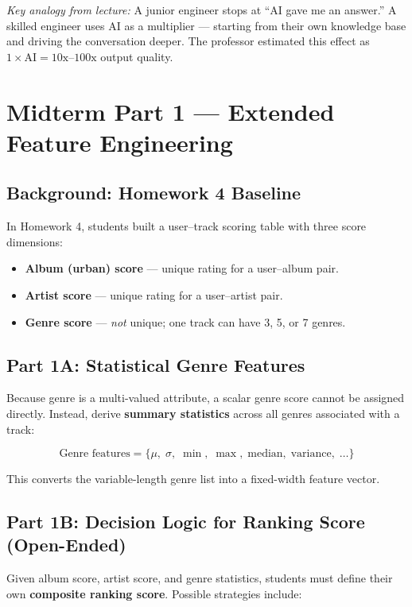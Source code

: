 \documentclass[11pt]{article}
\begin{document}
\textit{Key analogy from lecture:} A junior engineer stops at ``AI gave me an answer.''
A skilled engineer uses AI as a multiplier --- starting from their own knowledge base and driving the conversation deeper.
The professor estimated this effect as $1 \times \text{AI} = 10\text{x}$--$100\text{x}$ output quality.


\section{Midterm Part 1 --- Extended Feature Engineering}

\subsection{Background: Homework 4 Baseline}
In Homework 4, students built a user--track scoring table with three score dimensions:
\begin{itemize}
    \item \textbf{Album (urban) score} --- unique rating for a user--album pair.
    \item \textbf{Artist score} --- unique rating for a user--artist pair.
    \item \textbf{Genre score} --- \emph{not} unique; one track can have 3, 5, or 7 genres.
\end{itemize}

\subsection{Part 1A: Statistical Genre Features}
Because genre is a multi-valued attribute, a scalar genre score cannot be assigned directly.
Instead, derive \textbf{summary statistics} across all genres associated with a track:

\[
\text{Genre features} = \{\mu,\; \sigma,\; \min,\; \max,\; \text{median},\; \text{variance},\; \ldots\}
\]

This converts the variable-length genre list into a fixed-width feature vector.

\subsection{Part 1B: Decision Logic for Ranking Score (Open-Ended)}
Given album score, artist score, and genre statistics, students must define their own
\textbf{composite ranking score}. Possible strategies include:
\end{document}
